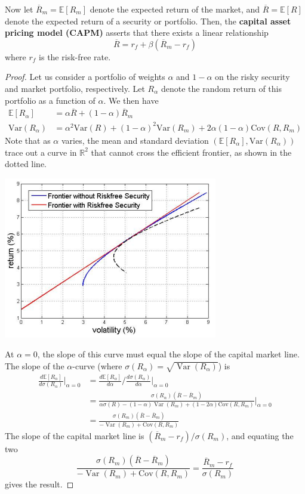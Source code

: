 \documentclass{article}
\DeclareMathOperator{\Var}{Var}
\begin{document}
\begin{theorem}[CAPM]
Now let $\overline{R}_m = \mathbb{E}[R_m]$ denote the expected return of the market, and $\overline{R} = \mathbb{E}[R]$ denote the expected return of a security or portfolio. Then, the \textbf{capital asset pricing model (CAPM)} asserts that there exists a linear relationship 
\[\overline{R} = r_f + \beta (\overline{R}_m - r_f)\]
where $r_f$ is the risk-free rate. 
\end{theorem}
\begin{proof}
Let us consider a portfolio of weights $\alpha$ and $1 - \alpha$ on the risky security and market portfolio, respectively. Let $R_\alpha$ denote the random return of this portfolio as a function of $\alpha$. We then have 
\begin{align*}
    \mathbb{E}[R_\alpha] & = \alpha \overline{R} + (1 - \alpha) \overline{R}_m \\
    \mathrm{Var}(R_\alpha) & = \alpha^2 \mathrm{Var}(R) + (1 - \alpha)^2 \mathrm{Var}(R_m) + 2 \alpha (1 - \alpha) \mathrm{Cov}(R, R_m)
\end{align*}
Note that as $\alpha$ varies, the mean and standard deviation $(\mathbb{E}[R_\alpha], \mathrm{Var}(R_\alpha))$ trace out a curve in $\mathbb{R}^2$ that cannot cross the efficient frontier, as shown in the dotted line. 
\begin{center}
    \includegraphics[scale=0.5]{img/CAPM.png}
\end{center}
At $\alpha = 0$, the slope of this curve must equal the slope of the capital market line. The slope of the $\alpha$-curve (where $\sigma(R_\alpha) = \sqrt{\Var(R_\alpha)}$) is 
\begin{align*}
    \frac{d \mathbb{E}[R_{\alpha}]}{d \sigma(R_\alpha)} \bigg|_{\alpha = 0} & = \frac{d\mathbb{E}[R_\alpha]}{d \alpha} \bigg/ \frac{d \sigma(R_\alpha)}{d \alpha} \bigg|_{\alpha = 0} \\
    & = \frac{\sigma(R_\alpha) (\overline{R} - \overline{R}_m)}{\alpha \sigma(R) - (1 - \alpha) \Var (R_m) + (1 - 2 \alpha) \mathrm{Cov}(R, R_m)} \bigg|_{\alpha = 0} \\
    & = \frac{\sigma(R_m) (\overline{R} - \overline{R}_m)}{-\Var(R_m) + \mathrm{Cov}(R, R_m)}
\end{align*}
The slope of the capital market line is $(\overline{R}_m - r_f) / \sigma(R_m)$, and equating the two 
\[\frac{\sigma(R_m) (\overline{R} - \overline{R}_m)}{-\Var(R_m) + \mathrm{Cov}(R, R_m)} = \frac{\overline{R}_m - r_f}{\sigma(R_m)}\]
gives the result. 
\end{proof}
\end{document}
